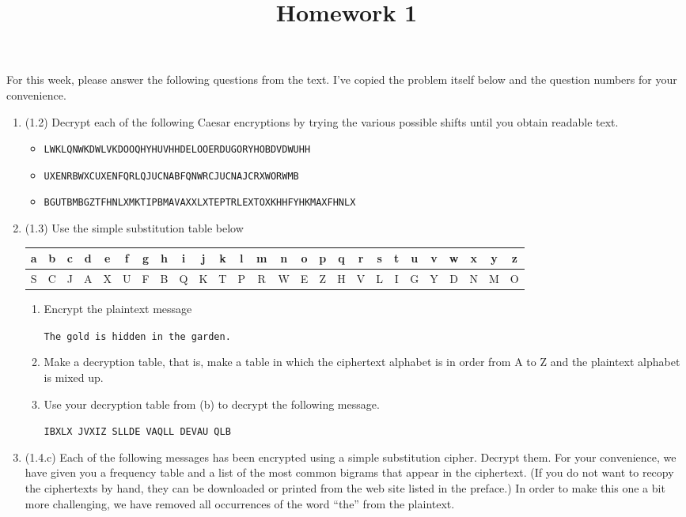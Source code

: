\documentclass[12pt]{amsart}
\theoremstyle{definition}
\begin{document}
\title{Homework 1}

\maketitle

For this week, please answer the following questions from the text. 
I've copied the problem itself below and the question numbers for 
your convenience. 

\begin{enumerate}
	\item (1.2) Decrypt each of the following Caesar encryptions by trying the various 
		possible shifts until you obtain readable text.
		\begin{itemize}
			\item \texttt{LWKLQNWKDWLVKDOOQHYHUVHHDELOOERDUGORYHOBDVDWUHH}
			\item \texttt{UXENRBWXCUXENFQRLQJUCNABFQNWRCJUCNAJCRXWORWMB}
			\item \texttt{BGUTBMBGZTFHNLXMKTIPBMAVAXXLXTEPTRLEXTOXKHHFYHKMAXFHNLX}
		\end{itemize}

	\item (1.3) Use the simple substitution table below
	\begin{center}
		\begin{tabular}{|c |c |c |c |c |c |c |c |c |c |c |c |c |c |c |c |c |c |c |c |c |c |c |c| c| c|}
			\hline
			a & b & c & d & e & f & g & h & i & j & k & l & m & n & o & 
			p & q & r & s & t & u & v & w & x & y & z \\
			\hline
			S & C & J & A & X & U & F & B & Q & K & T & P & R & W & E & 
			Z & H & V & L & I & G & Y & D & N & M & O \\
			\hline
		\end{tabular}
	\end{center}
	\begin{enumerate}
		\item Encrypt the plaintext message
		\begin{center}
			\texttt{The gold is hidden in the garden.}
		\end{center}
		\item Make a decryption table, that is, make a table in which the ciphertext 
			alphabet is in order from A to Z and the plaintext alphabet is mixed up.
		\item Use your decryption table from (b) to decrypt the following message.
		\begin{center}
			\texttt{IBXLX JVXIZ SLLDE VAQLL DEVAU QLB}
		\end{center}
	\end{enumerate}
\item (1.4.c) Each of the following messages has been encrypted using a simple
	substitution cipher. Decrypt them. For your convenience, we have given
	you a frequency table and a list of the most common bigrams that appear
	in the ciphertext. (If you do not want to recopy the ciphertexts by
	hand, they can be downloaded or printed from the web site listed in the
	preface.) In order to make this one a bit more challenging, we have
	removed all occurrences of the word “the” from the plaintext. 


\end{enumerate}
\end{document}
